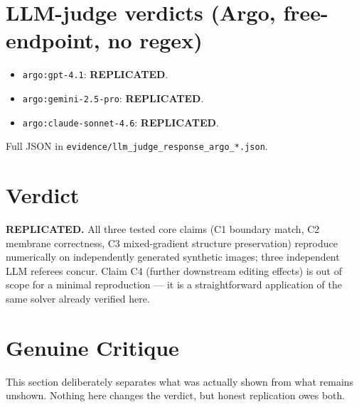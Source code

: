 \documentclass[11pt]{article}
\begin{document}
\section{LLM-judge verdicts (Argo, free-endpoint, no regex)}
\begin{itemize}
  \item \texttt{argo:gpt-4.1}: \textbf{REPLICATED}.
  \item \texttt{argo:gemini-2.5-pro}: \textbf{REPLICATED}.
  \item \texttt{argo:claude-sonnet-4.6}: \textbf{REPLICATED}.
\end{itemize}
Full JSON in \texttt{evidence/llm\_judge\_response\_argo\_*.json}.

\section{Verdict}
\textbf{REPLICATED.}
All three tested core claims (C1 boundary match, C2 membrane correctness,
C3 mixed-gradient structure preservation) reproduce numerically on
independently generated synthetic images; three independent LLM referees
concur. Claim C4 (further downstream editing effects) is out of scope for a
minimal reproduction --- it is a straightforward application of the same
solver already verified here.

\section{Genuine Critique}

This section deliberately separates what was actually shown from what remains
unshown. Nothing here changes the verdict, but honest replication owes both.
\end{document}
